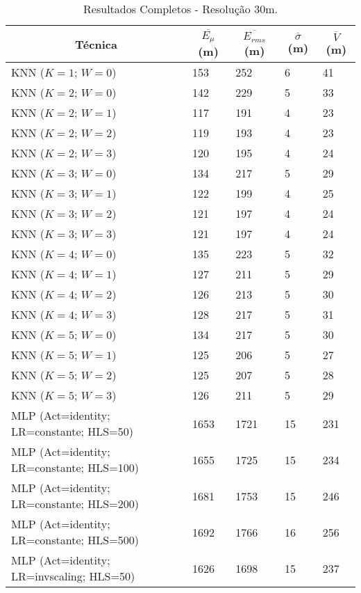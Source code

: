 \begin{center}
\begin{longtable}{|l|l|l|l|l|}
\caption{Resultados Completos - Resolução 30m.} 
\label{table:resultsComplete30m} \\
\hline \multicolumn{1}{|c|}{\textbf{Técnica}} & \multicolumn{1}{c|}{\textbf{$\overline{E_{\mu}}$ (m)}} & \multicolumn{1}{c|}{\textbf{$\overline{E_{rms}}$ (m)}} & \multicolumn{1}{c|}{\textbf{$\overline{\sigma}$ (m)}} & \multicolumn{1}{c|}{\textbf{$\overline{V}$ (m)}} \\ \hline 
\endfirsthead
\hline
\endlastfoot
KNN ($K=1$; $W=0$) & 153 & 252 & 6 & 41 \\
KNN ($K=2$; $W=0$) & 142 & 229 & 5 & 33 \\
KNN ($K=2$; $W=1$) & 117 & 191 & 4 & 23 \\
KNN ($K=2$; $W=2$) & 119 & 193 & 4 & 23 \\
KNN ($K=2$; $W=3$) & 120 & 195 & 4 & 24 \\
KNN ($K=3$; $W=0$) & 134 & 217 & 5 & 29 \\
KNN ($K=3$; $W=1$) & 122 & 199 & 4 & 25 \\
KNN ($K=3$; $W=2$) & 121 & 197 & 4 & 24 \\
KNN ($K=3$; $W=3$) & 121 & 197 & 4 & 24 \\
KNN ($K=4$; $W=0$) & 135 & 223 & 5 & 32 \\
KNN ($K=4$; $W=1$) & 127 & 211 & 5 & 29 \\
KNN ($K=4$; $W=2$) & 126 & 213 & 5 & 30 \\
KNN ($K=4$; $W=3$) & 128 & 217 & 5 & 31 \\
KNN ($K=5$; $W=0$) & 134 & 217 & 5 & 30 \\
KNN ($K=5$; $W=1$) & 125 & 206 & 5 & 27 \\
KNN ($K=5$; $W=2$) & 125 & 207 & 5 & 28 \\
KNN ($K=5$; $W=3$) & 126 & 211 & 5 & 29 \\
MLP (Act=identity; LR=constante; HLS=50) & 1653 & 1721 & 15 & 231 \\
MLP (Act=identity; LR=constante; HLS=100) & 1655 & 1725 & 15 & 234 \\
MLP (Act=identity; LR=constante; HLS=200) & 1681 & 1753 & 15 & 246 \\
MLP (Act=identity; LR=constante; HLS=500) & 1692 & 1766 & 16 & 256 \\
MLP (Act=identity; LR=invscaling; HLS=50) & 1626 & 1698 & 15 & 237 \\

\end{longtable}
\end{center}
